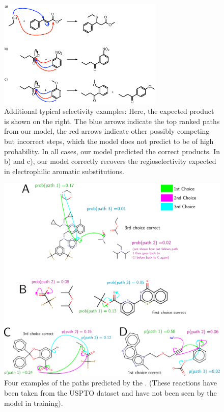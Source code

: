 \begin{figure}[h]
        \centering
        \includegraphics[width=0.7\textwidth]{imgs/textbook/additionalexamples.eps}
        \caption{Additional typical selectivity examples: Here, the expected product is shown on the right. The blue arrows indicate the top ranked paths from our model, the red arrows indicate other possibly competing but incorrect steps, which the model does not predict to be of high probability. In all cases, our model predicted the correct products. In b) and c), our model correctly recovers the regioselectivity expected in electrophilic aromatic substitutions.}
        \label{fig:extra-textbook-example2}
\end{figure}




\begin{figure}[h]
        \centering
        \includegraphics[width=1.0\textwidth]{imgs/appendix_examples}
        \caption{Four examples of the paths predicted by the \ourModelIR. (These reactions have been taken from the USPTO dataset and have not been seen by the model in training).}
        \label{fig:appendix_examples}
\end{figure}



